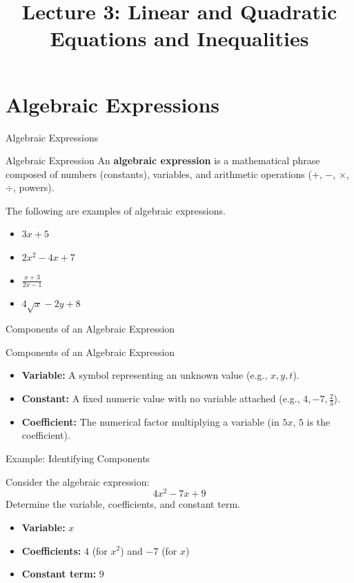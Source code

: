 \title{Lecture 3: Linear and Quadratic Equations and Inequalities}
\frame{\titlepage}

\section[Expressions]{Algebraic Expressions}
\frame{\sectionpage}

\begin{frame}{Algebraic Expressions}
\begin{defn}{Algebraic Expression}{}
An \textbf{algebraic expression} is a mathematical phrase composed of numbers (constants), variables, and arithmetic operations ($+$, $-$, $\times$, $\div$, powers).
\end{defn}

\begin{ex}
The following are examples of algebraic expressions.
\begin{itemize}
\item $3x + 5$
\item $2x^2 - 4x + 7$
\item $\displaystyle \frac{x + 3}{2x - 1}$
\item $4\sqrt{x} - 2y + 8$
\end{itemize}
\end{ex}
\end{frame}

\begin{frame}{Components of an Algebraic Expression}
\begin{defn}{Components of an Algebraic Expression}{}
\begin{itemize}
\item \textbf{Variable:} A symbol representing an unknown value (e.g., $x, y, t$).
\item \textbf{Constant:} A fixed numeric value with no variable attached (e.g., $4, -7, \frac{2}{3}$).
\item \textbf{Coefficient:} The numerical factor multiplying a variable (in $5x$, $5$ is the coefficient).
\end{itemize}
\end{defn}
\end{frame}

\begin{frame}{Example: Identifying Components}
\begin{ex}
Consider the algebraic expression:
\[ 4x^2 - 7x + 9 \]
Determine the variable, coefficients, and constant term.
\end{ex}
\begin{sol}
\begin{itemize}
\item \textbf{Variable:} $x$
\item \textbf{Coefficients:} $4$ (for $x^2$) and $-7$ (for $x$)
\item \textbf{Constant term:} $9$
\end{itemize}
\end{sol}
\end{frame}


